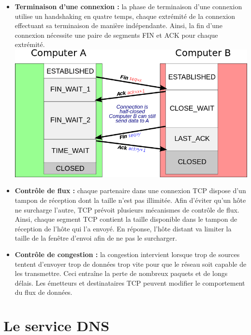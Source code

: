 \documentclass[a4paper,9pt, twocolumn]{article}
\begin{document}
\begin{itemize}
		\item \textbf{Terminaison d'une connexion :}
			la phase de terminaison d'une connexion utilise un handshaking en quatre temps, chaque extrémité de la connexion effectuant sa terminaison de manière indépendante.
			Ainsi, la fin d'une connexion nécessite une paire de segments FIN et ACK pour chaque extrémité.
			\includegraphics[scale=0.28]{term.png}
		\item \textbf{Contrôle de flux :}
			chaque partenaire dans une connexion TCP dispose d'un tampon de réception dont la taille n'est pas illimitée.
			Afin d'éviter qu'un hôte ne surcharge l'autre, TCP prévoit plusieurs mécanismes de contrôle de flux.
			Ainsi, chaque segment TCP contient la taille disponible dans le tampon de réception de l'hôte qui l'a envoyé.
			En réponse, l'hôte distant va limiter la taille de la fenêtre d'envoi afin de ne pas le surcharger.
		\item \textbf{Contrôle de congestion :}
			la congestion intervient lorsque trop de sources tentent d'envoyer trop de données trop vite pour que le réseau soit capable de les transmettre. Ceci entraîne la perte de nombreux paquets et de longs délais. Les émetteurs et destinataires TCP peuvent modifier le comportement du flux de données.
	\end{itemize}


\section*{Le service DNS}
\end{document}
